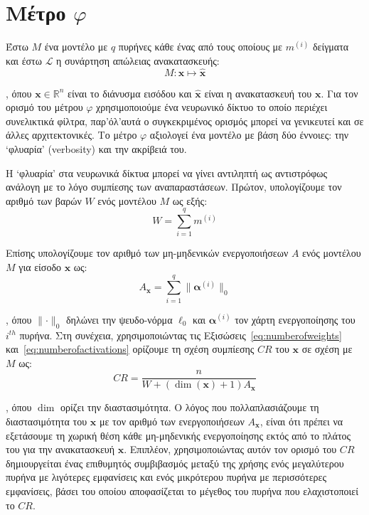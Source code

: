 \section{Μέτρο $\varphi$}
\label{sec6:flethos}
Έστω $M$ ένα μοντέλο με $q$ πυρήνες κάθε ένας από τους οποίους με $m^{(i)}$ δείγματα και έστω $\mathcal{L}$ η συνάρτηση απώλειας ανακατασκευής:
\begin{equation}
	\label{eq:model}
	M: \bm{x} \longmapsto \hat{\bm{x}}
\end{equation}

\noindent
, όπου $\bm{x} \in \mathbb{R}^n$ είναι το διάνυσμα εισόδου και $\hat{\bm{x}}$ είναι η ανακατασκευή του $\bm{x}$.
Για τον ορισμό του μέτρου $\varphi$ χρησιμοποιούμε ένα νευρωνικό δίκτυο το οποίο περιέχει συνελικτικά φίλτρα, παρ'όλ'αυτά ο συγκεκριμένος ορισμός μπορεί να γενικευτεί και σε άλλες αρχιτεκτονικές.
Το μέτρο $\varphi$ αξιολογεί ένα μοντέλο με βάση δύο έννοιες: την `φλυαρία' (verbosity) και την ακρίβειά του.

Η `φλυαρία' στα νευρωνικά δίκτυα μπορεί να γίνει αντιληπτή ως αντιστρόφως ανάλογη με το λόγο συμπίεσης των αναπαραστάσεων.
Πρώτον, υπολογίζουμε τον αριθμό των βαρών $W$ ενός μοντέλου $M$ ως εξής:
\begin{equation}
	\label{eq:numberofweights}
	W = \sum\limits_{i=1}^q m^{(i)}
\end{equation}

Επίσης υπολογίζουμε τον αριθμό των μη-μηδενικών ενεργοποιήσεων $A$ ενός μοντέλου $M$ για είσοδο $\bm{x}$ ως:
\begin{equation}
	\label{eq:numberofactivations}
	A_{\bm{x}} = \sum\limits_{i=1}^q \Big\lVert\bm{\alpha}^{(i)}\Big\lVert_0
\end{equation}

\noindent
, όπου $\lVert \cdot \rVert_0$ δηλώνει την ψευδο-νόρμα $\ell_0$ και $\bm{\alpha}^{(i)}$ τον χάρτη ενεργοποίησης του $i^{th}$ πυρήνα.
Στη συνέχεια, χρησιμοποιώντας τις Εξισώσεις~\ref{eq:numberofweights} και~\ref{eq:numberofactivations} ορίζουμε τη σχέση συμπίεσης $CR$ του $\bm{x}$ σε σχέση με $M$ ως:
\begin{equation}
	\label{eq:compressionratio}
	CR = \frac{n}{W + (\dim(\bm{x}) + 1)A_{\bm{x}}}
\end{equation}

\noindent
, όπου $\dim$ ορίζει την διαστασιμότητα.
Ο λόγος που πολλαπλασιάζουμε τη διαστασιμότητα του $\bm{x}$ με τον αριθμό των ενεργοποιήσεων $A_{\bm{x}}$, είναι ότι πρέπει να εξετάσουμε τη χωρική θέση κάθε μη-μηδενικής ενεργοποίησης εκτός από το πλάτος του για την ανακατασκευή $\bm{x}$.
Επιπλέον, χρησιμοποιώντας αυτόν τον ορισμό του $CR$ δημιουργείται ένας επιθυμητός συμβιβασμός μεταξύ της χρήσης ενός μεγαλύτερου πυρήνα με λιγότερες εμφανίσεις και ενός μικρότερου πυρήνα με περισσότερες εμφανίσεις, βάσει του οποίου αποφασίζεται το μέγεθος του πυρήνα που ελαχιστοποιεί το $CR$.

